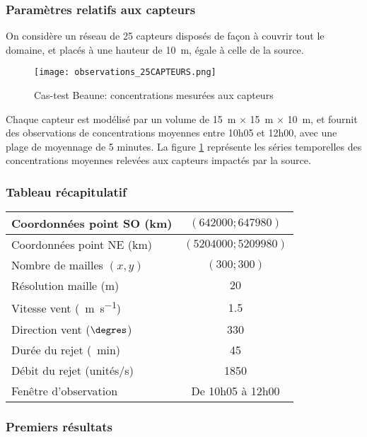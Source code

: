 \subsubsection{Paramètres relatifs aux capteurs}
On considère un réseau de 25 capteurs disposés de façon à couvrir tout le domaine, et placés à une hauteur de \SI{10}{\meter}, égale à celle de la source. 

\begin{figure}[h!]
	\centering
	\texttt{[image: observations\_25CAPTEURS.png]}
	\caption{Cas-test Beaune: concentrations mesurées aux capteurs}
	\label{fig_observations_25CAPTEURS}
\end{figure}

Chaque capteur est modélisé par un volume de \SI{15}{\meter} $\times$ \SI{15}{\meter} $\times$ \SI{10}{\meter}, et fournit des observations de concentrations moyennes entre 10h05 et 12h00, avec une plage de moyennage de 5 minutes. La figure \ref{fig_observations_25CAPTEURS} représente les séries temporelles des concentrations moyennes relevées aux capteurs impactés par la source. 

\subsubsection{Tableau récapitulatif}

\begin{center}
	\begin{tabular}{| l || c | }
		\hline			
		Coordonnées point SO (km) & $(642000;647980)$  \\
		\hline
		Coordonnées point NE (km) & $(5204000;5209980)$ \\
		\hline
		Nombre de mailles $(x,y)$ & $(300;300)$ \\
		\hline
		Résolution maille (m) & $20$ \\
		\hline
		Vitesse vent (\SI{}{\meter\per\second}) & 1.5 \\
		\hline
		Direction vent ($\degres$) & 330 \\
		\hline
		Durée du rejet (\SI{}{\minute}) & 45 \\
		\hline
		Débit du rejet (unités/s) & 1850 \\
		\hline
		Fenêtre d'observation & De 10h05 à 12h00 \\
		\hline
	\end{tabular}
\end{center}

\subsubsection{Premiers résultats}

